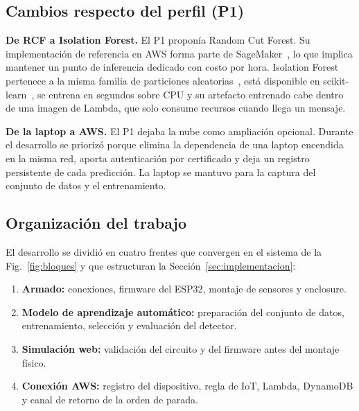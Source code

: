 \documentclass[10pt,twocolumn]{article}
\begin{document}
\subsection{Cambios respecto del perfil (P1)}

\textbf{De RCF a Isolation Forest.} El P1 proponía Random Cut Forest. Su implementación de
referencia en AWS forma parte de SageMaker~\cite{awsrcf}, lo que implica mantener un punto de
inferencia dedicado con costo por hora. Isolation Forest pertenece a la misma familia de
particiones aleatorias~\cite{liu2008}, está disponible en scikit-learn~\cite{sklearn}, se entrena
en segundos sobre CPU y su artefacto entrenado cabe dentro de una imagen de Lambda, que solo
consume recursos cuando llega un mensaje.

\textbf{De la laptop a AWS.} El P1 dejaba la nube como ampliación opcional. Durante el desarrollo
se priorizó porque elimina la dependencia de una laptop encendida en la misma red, aporta
autenticación por certificado y deja un registro persistente de cada predicción. La laptop se
mantuvo para la captura del conjunto de datos y el entrenamiento.

\subsection{Organización del trabajo}

El desarrollo se dividió en cuatro frentes que convergen en el sistema de la
Fig.~\ref{fig:bloques} y que estructuran la Sección~\ref{sec:implementacion}:
\begin{enumerate}
  \item \textbf{Armado:} conexiones, firmware del ESP32, montaje de sensores y enclosure.
  \item \textbf{Modelo de aprendizaje automático:} preparación del conjunto de datos,
        entrenamiento, selección y evaluación del detector.
  \item \textbf{Simulación web:} validación del circuito y del firmware antes del montaje físico.
  \item \textbf{Conexión AWS:} registro del dispositivo, regla de IoT, Lambda, DynamoDB y canal
        de retorno de la orden de parada.
\end{enumerate}
\end{document}
